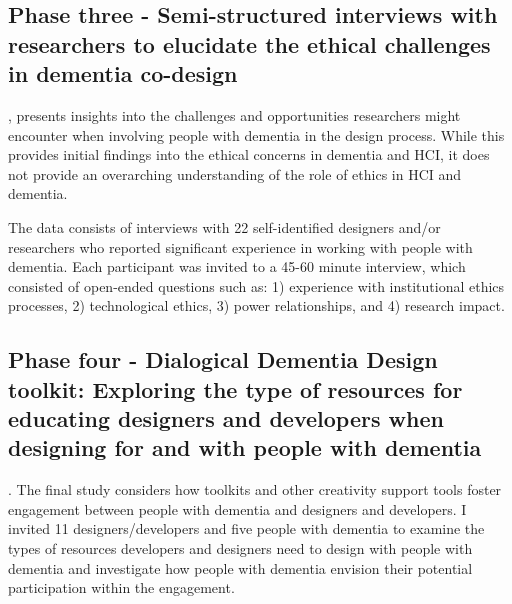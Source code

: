 \subsection{Phase three - Semi-structured interviews with researchers to elucidate the ethical challenges in dementia co-design}

, presents insights into the challenges and opportunities researchers might encounter when involving people with dementia in the design process. While this provides initial findings into the ethical concerns in dementia and HCI, it does not provide an overarching understanding of the role of ethics in HCI and dementia. 

The data consists of interviews with 22 self-identified designers and/or researchers who reported significant experience in working with people with dementia. Each participant was invited to a 45-60 minute interview, which consisted of open-ended questions such as: 1) experience with institutional ethics processes, 2) technological ethics,
3) power relationships, and 4) research impact. 

\subsection{Phase four - Dialogical Dementia Design toolkit: Exploring the type of resources for educating designers and developers when designing for and with people with dementia}

. The final study considers how toolkits and other creativity support tools foster engagement between people with dementia and designers and developers. I invited 11 designers/developers and five people with dementia to examine the types of resources developers and designers need to design with people with dementia and investigate how people with dementia envision their potential participation within the engagement.

